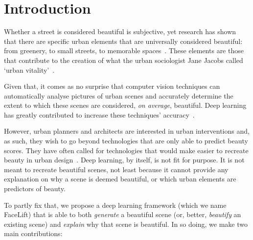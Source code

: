 \section{Introduction}


Whether a street is considered beautiful is subjective, yet research has shown that there are specific urban elements that are universally considered beautiful: from greenery, to small streets, to memorable spaces~\cite{alexander1977pattern, quercia2014aesthetic,salesses2013collaborative}. These elements are those that contribute to the creation of what the urban sociologist Jane Jacobs called `urban vitality'~\cite{jacobs1961death}. 


Given that, it comes as no surprise that computer vision techniques can automatically analyse pictures of urban scenes and accurately determine the extent to which these scenes are considered, \emph{on average}, beautiful.  Deep learning has greatly contributed to increase these techniques' accuracy~\cite{dubey2016deep}.

However, urban planners and architects are interested in urban interventions and, as such, they wish to go beyond technologies that are only able to predict beauty scores. They have often called for technologies that would make easier to recreate beauty in urban design~\cite{de2008architecture}. Deep learning, by itself, is not fit for purpose. It is not meant to recreate beautiful scenes, not least because it cannot provide any explanation on why a scene is deemed beautiful, or which urban elements are predictors of beauty.


To partly fix that, we propose a deep learning framework (which we name  FaceLift) that is able to both \emph{generate} a beautiful scene (or, better, \emph{beautify} an existing scene) and \emph{explain} why that scene is beautiful. In so doing, we make two main contributions:

